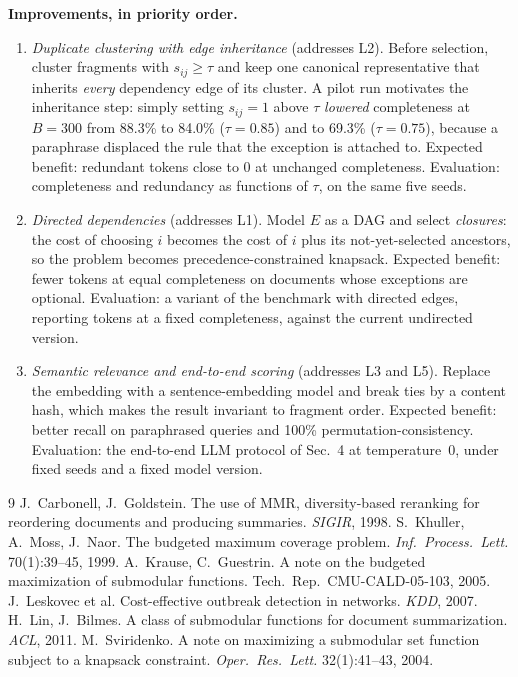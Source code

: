 \documentclass[10pt,a4paper]{article}
\begin{document}
\textbf{Improvements, in priority order.}
\begin{enumerate}
\item \emph{Duplicate clustering with edge inheritance} (addresses L2). Before selection, cluster fragments with $s_{ij}\ge\tau$ and keep one canonical representative that inherits \emph{every} dependency edge of its cluster. A pilot run motivates the inheritance step: simply setting $s_{ij}=1$ above $\tau$ \emph{lowered} completeness at $B=300$ from 88.3\% to 84.0\% ($\tau=0.85$) and to 69.3\% ($\tau=0.75$), because a paraphrase displaced the rule that the exception is attached to. Expected benefit: redundant tokens close to 0 at unchanged completeness. Evaluation: completeness and redundancy as functions of $\tau$, on the same five seeds.
\item \emph{Directed dependencies} (addresses L1). Model $E$ as a DAG and select \emph{closures}: the cost of choosing $i$ becomes the cost of $i$ plus its not-yet-selected ancestors, so the problem becomes precedence-constrained knapsack. Expected benefit: fewer tokens at equal completeness on documents whose exceptions are optional. Evaluation: a variant of the benchmark with directed edges, reporting tokens at a fixed completeness, against the current undirected version.
\item \emph{Semantic relevance and end-to-end scoring} (addresses L3 and L5). Replace the embedding with a sentence-embedding model and break ties by a content hash, which makes the result invariant to fragment order. Expected benefit: better recall on paraphrased queries and 100\% permutation-consistency. Evaluation: the end-to-end LLM protocol of Sec.~4 at temperature~0, under fixed seeds and a fixed model version.
\end{enumerate}

\vspace{-0.4em}
{\footnotesize
\begin{thebibliography}{9}\setlength{\itemsep}{0pt}
 J.~Carbonell, J.~Goldstein. The use of MMR, diversity-based reranking for reordering documents and producing summaries. \emph{SIGIR}, 1998.
 S.~Khuller, A.~Moss, J.~Naor. The budgeted maximum coverage problem. \emph{Inf.\ Process.\ Lett.} 70(1):39--45, 1999.
 A.~Krause, C.~Guestrin. A note on the budgeted maximization of submodular functions. Tech.\ Rep.\ CMU-CALD-05-103, 2005.
 J.~Leskovec et al. Cost-effective outbreak detection in networks. \emph{KDD}, 2007.
 H.~Lin, J.~Bilmes. A class of submodular functions for document summarization. \emph{ACL}, 2011.
 M.~Sviridenko. A note on maximizing a submodular set function subject to a knapsack constraint. \emph{Oper.\ Res.\ Lett.} 32(1):41--43, 2004.
\end{thebibliography}}
\end{document}
